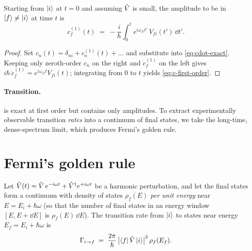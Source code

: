\begin{statement}
\label{stmt:first-order}
Starting from $\ket{i}$ at $t=0$ and assuming $\hat{V}$ is small, the
amplitude to be in $\ket{f}\neq\ket{i}$ at time $t$ is
\begin{equation}
\label{eq:c-first-order}
c_f^{(1)}(t) \;=\; -\frac{i}{\hbar}\int_0^t e^{i\omega_{fi}t'}\,V_{fi}(t')\,\dd t'.
\end{equation}
\end{statement}

\begin{proof}
Set $c_n(t)=\delta_{ni}+c_n^{(1)}(t)+\ldots$ and substitute into
\cref{eq:cdot-exact}. Keeping only zeroth-order $c_n$ on the right
and $\dot c_f^{(1)}$ on the left gives
$i\hbar\,\dot c_f^{(1)}=e^{i\omega_{fi}t}V_{fi}(t)$; integrating from
$0$ to $t$ yields \cref{eq:c-first-order}.
\end{proof}

\paragraph{Transition.}
 is exact at first order but contains only
amplitudes. To extract experimentally observable transition
\emph{rates} into a continuum of final states, we take the
long-time, dense-spectrum limit, which produces Fermi's golden rule.

\section{Fermi's golden rule}
\label{sec:fermi}

\begin{theorem}
\label{thm:fermi}
Let $\hat{V}(t)=\hat{V}\,e^{-i\omega t}+\hat{V}^\dagger e^{+i\omega t}$ be a
harmonic perturbation, and let the final states form a continuum
with density of states $\rho_f(E)$ \emph{per unit energy} near
$E=E_i+\hbar\omega$ (so that the number of final states in an
energy window $[E,E+\dd E]$ is $\rho_f(E)\,\dd E$). The
transition rate from $\ket{i}$ to states near energy
$E_f=E_i+\hbar\omega$ is
\begin{equation}
\label{eq:fermi}
\Gamma_{i\to f} \;=\; \frac{2\pi}{\hbar}\,\bigl|\bra{f}\hat{V}\ket{i}\bigr|^2\,\rho_f(E_f).
\end{equation}
\end{theorem}

